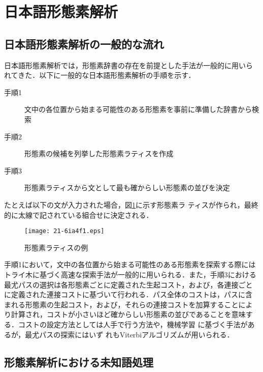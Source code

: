 \documentclass[japanese]{jnlp_1.4}
\begin{document}
 \section{日本語形態素解析}

  \subsection{日本語形態素解析の一般的な流れ}
  日本語形態素解析では，形態素辞書の存在を前提とした手法が一般的に用いら
  れてきた．以下に一般的な日本語形態素解析の手順を示す．

  \begin{description}
   \item[手順1] 文中の各位置から始まる可能性のある形態素を事前に準備した辞書から検索
   \item[手順2] 形態素の候補を列挙した形態素ラティスを作成
   \item[手順3] 形態素ラティスから文として最も確からしい形態素の並びを決定
  \end{description}

  たとえば以下の文が入力された場合，図\ref{Figure::lattice}に示す形態素ラ
  ティスが作られ，最終的に太線で記されている組合せに決定される．

  \begin{figure}[b]
   \begin{center}
    \texttt{[image: 21-6ia4f1.eps]}
   \end{center}
   \caption{形態素ラティスの例}
   \label{Figure::lattice}
  \end{figure}

\begin{exe}
\end{exe}

  手順1において，文中の各位置から始まる可能性のある形態素を探索する際には
  トライ木に基づく高速な探索手法が一般的に用いられる．また，手順3における
  最尤パスの選択は各形態素ごとに定義された生起コスト，および，各連接ごと
  に定義された連接コストに基づいて行われる．パス全体のコストは，パスに含
  まれる形態素の生起コスト，および，それらの連接コストを加算することによ
  り計算され，コストが小さいほど確からしい形態素の並びであることを意味す
  る．コストの設定方法としては人手で行う方法\cite{Juman1994}や，機械学習
  に基づく手法\cite{Asahara2000,Kudo2004}があるが，最尤パスの探索にはいず
  れもViterbiアルゴリズムが用いられる．


  \subsection{形態素解析における未知語処理}
\end{document}
